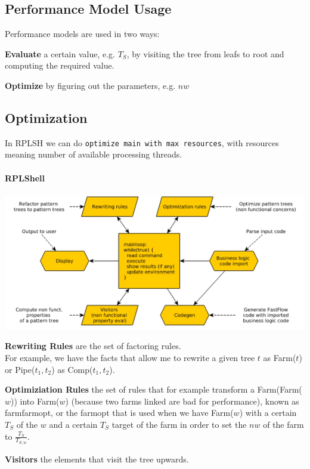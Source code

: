 \documentclass[10pt]{report}
\begin{document}
\subsection{Performance Model Usage}
Performance models are used in two ways:
\begin{list}{}{}
	\item \textbf{Evaluate} a certain value, e.g. $T_S$, by visiting the tree from leafs to root and computing the required value.
	\item \textbf{Optimize} by figuring out the parameters, e.g. $nw$
\end{list}
\subsection{Optimization}
In RPLSH we can do \texttt{optimize main with max resources}, with resources meaning number of available processing threads.
\paragraph{RPLShell} \begin{center}
	\includegraphics[scale=0.5]{13.png}
\end{center}
\begin{list}{}{}
	\item \textbf{Rewriting Rules} are the set of factoring rules.\\
	For example, we have the facts that allow me to rewrite a given tree $t$ as Farm($t$) or Pipe($t_1,t_2$) as Comp($t_1,t_2$).
	\item \textbf{Optimiziation Rules} the set of rules that for example transform a Farm(Farm($w$)) into Farm($w$) (because two farms linked are bad for performance), known as farmfarmopt, or the farmopt that is used when we have Farm($w$) with a certain $T_S$ of the $w$ and a certain $T_S$ target of the farm in order to set the $nw$ of the farm to $\frac{T_S}{T_{S,w}}$.
	\item \textbf{Visitors} the elements that visit the tree upwards.
\end{list}
\end{document}
